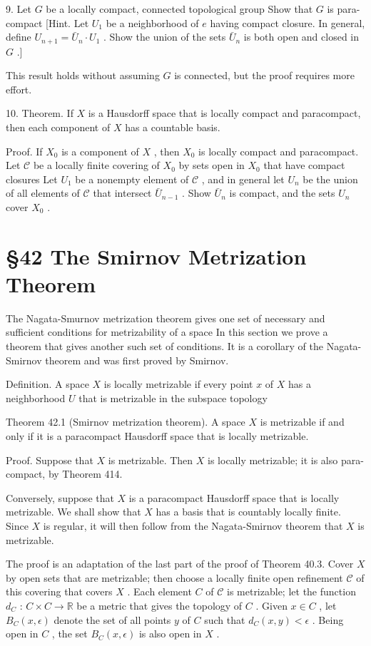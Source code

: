 9. Let \(G\) be a locally compact, connected topological group Show that \(G\) is para-compact [Hint. Let \({U}_{1}\) be a neighborhood of \(e\) having compact closure. In general, define \({U}_{n + 1} = {\bar{U}}_{n} \cdot  {U}_{1}\) . Show the union of the sets \({\bar{U}}_{n}\) is both open and closed in \(G\) .]

This result holds without assuming \(G\) is connected, but the proof requires more effort.

10. Theorem. If \(X\) is a Hausdorff space that is locally compact and paracompact, then each component of \(X\) has a countable basis.

Proof. If \({X}_{0}\) is a component of \(X\) , then \({X}_{0}\) is locally compact and paracompact. Let \(\mathcal{C}\) be a locally finite covering of \({X}_{0}\) by sets open in \({X}_{0}\) that have compact closures Let \({U}_{1}\) be a nonempty element of \(\mathcal{C}\) , and in general let \({U}_{n}\) be the union of all elements of \(\mathcal{C}\) that intersect \({\bar{U}}_{n - 1}\) . Show \({\bar{U}}_{n}\) is compact, and the sets \({U}_{n}\) cover \({X}_{0}\) .

\section*{§42 The Smirnov Metrization Theorem}

The Nagata-Smurnov metrization theorem gives one set of necessary and sufficient conditions for metrizability of a space In this section we prove a theorem that gives another such set of conditions. It is a corollary of the Nagata-Smirnov theorem and was first proved by Smirnov.

Definition. A space \(X\) is locally metrizable if every point \(x\) of \(X\) has a neighborhood \(U\) that is metrizable in the subspace topology

Theorem 42.1 (Smirnov metrization theorem). A space \(X\) is metrizable if and only if it is a paracompact Hausdorff space that is locally metrizable.

Proof. Suppose that \(X\) is metrizable. Then \(X\) is locally metrizable; it is also para-compact, by Theorem 414.

Conversely, suppose that \(X\) is a paracompact Hausdorff space that is locally metrizable. We shall show that \(X\) has a basis that is countably locally finite. Since \(X\) is regular, it will then follow from the Nagata-Smirnov theorem that \(X\) is metrizable.

The proof is an adaptation of the last part of the proof of Theorem 40.3. Cover \(X\) by open sets that are metrizable; then choose a locally finite open refinement \(\mathcal{C}\) of this covering that covers \(X\) . Each element \(C\) of \(\mathcal{C}\) is metrizable; let the function \({d}_{C}\) : \(C \times  C \rightarrow  \mathbb{R}\) be a metric that gives the topology of \(C\) . Given \(x \in  C\) , let \({B}_{C}\left( {x,\epsilon }\right)\) denote the set of all points \(y\) of \(C\) such that \({d}_{C}\left( {x,y}\right)  < \epsilon\) . Being open in \(C\) , the set \({B}_{C}\left( {x,\epsilon }\right)\) is also open in \(X\) .

